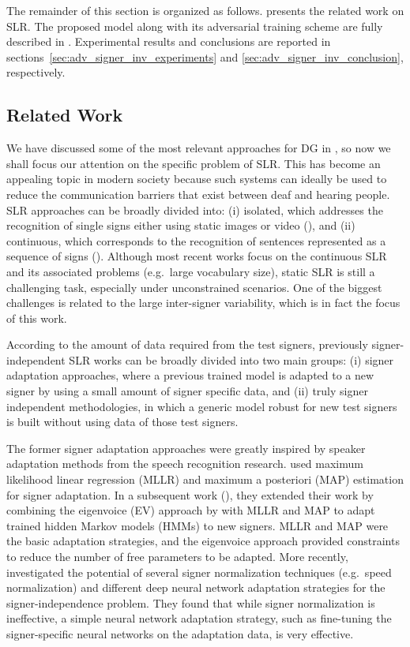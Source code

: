 The remainder of this section is organized as follows.  presents the related work on SLR. The proposed model along with its adversarial training scheme are fully described in . Experimental results and conclusions are reported in sections~\ref{sec:adv_signer_inv_experiments} and \ref{sec:adv_signer_inv_conclusion}, respectively.

\subsection{Related Work}
\label{sec:adv_signer_inv_rel_work}
We have discussed some of the most relevant approaches for DG in , so now we shall focus our attention on the specific problem of SLR. This has become an appealing topic in modern society because such systems can ideally be used to reduce the communication barriers that exist between deaf and hearing people.
SLR approaches can be broadly divided into: (i) isolated, which addresses the recognition of single signs either using static images or video (\citet{Marin2014, Marin2016}), and (ii) continuous, which corresponds to the recognition of sentences represented as a sequence of signs (\citet{DanGuo2017, DanGuo2018, Wang2018}). Although most recent works focus on the continuous SLR and its associated problems (e.g.\ large vocabulary size), static SLR is still a challenging task, especially under unconstrained scenarios. One of the biggest challenges is related to the large inter-signer variability, which is in fact the focus of this work.

According to the amount of data required from the test signers, previously signer-independent SLR works can be broadly divided into two main groups: (i) signer adaptation approaches, where a previous trained model is adapted to a new signer by using a small amount of signer specific data, and (ii) truly signer independent methodologies, in which a generic model robust for new test signers is built without using data of those test signers.

The former signer adaptation approaches were greatly inspired by speaker adaptation methods from the speech recognition research. \citet{Agris2006} used maximum likelihood linear regression (MLLR) and maximum a posteriori (MAP) estimation for signer adaptation. In a subsequent work (\citet{Agris2008a}), they extended their work by combining the eigenvoice (EV) approach by \citet{Kuhn2000} with MLLR and MAP to adapt trained hidden Markov models (HMMs) to new signers. MLLR and MAP were the basic adaptation strategies, and the eigenvoice approach provided constraints to reduce the number of free parameters to be adapted. More recently, \citet{Kim2016} investigated the potential of several signer normalization techniques (e.g.\ speed normalization) and different deep neural network adaptation strategies for the signer-independence problem. They found that while signer normalization is ineffective, a simple neural network adaptation strategy, such as fine-tuning the signer-specific neural networks on the adaptation data, is very effective.

